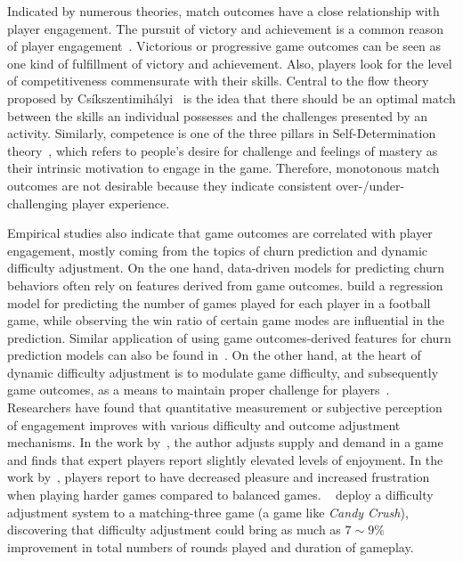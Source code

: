 Indicated by numerous theories, match outcomes have a close relationship with player engagement. The pursuit of victory and achievement is a common reason of player engagement~\cite{schoenau2011player,yee2006motivations,sherry2006video,wu2010falling,lazzaro2004we}. Victorious or progressive game outcomes can be seen as one kind of fulfillment of victory and achievement. Also, players look for the level of competitiveness commensurate with their skills. Central to the flow theory proposed by Cs\'{i}kszentimih\'{a}lyi~\cite{sweetser2005gameflow,flow1990psychology,chen2007flow} is the idea that there should be an optimal match between the skills an individual possesses and the challenges presented by an activity. Similarly, competence is one of the three pillars in Self-Determination theory~\cite{przybylski2010motivational,ryan2006motivational}, which refers to people's desire for challenge and feelings of mastery as their intrinsic motivation to engage in the game. Therefore, monotonous match outcomes are not desirable because they indicate consistent over-/under-challenging player experience. 

Empirical studies also indicate that game outcomes are correlated with player engagement, mostly coming from the topics of churn prediction and dynamic difficulty adjustment. On the one hand, data-driven models for predicting churn behaviors often rely on features derived from game outcomes. \cite{weber2011using} build a regression model for predicting the number of games played for each player in a football game, while observing the win ratio of certain game modes are influential in the prediction. Similar application of using game outcomes-derived features for churn prediction models can also be found in~\cite{harrison2012players,xie2015predicting,}. On the other hand, at the heart of dynamic difficulty adjustment is to modulate game difficulty, and subsequently game outcomes, as a means to maintain proper challenge for players~\cite{hunicke2005case}. Researchers have found that quantitative measurement or subjective perception of engagement improves with various difficulty and outcome adjustment mechanisms. In the work by~\cite{hunicke2005case}, the author adjusts supply and demand in a game and finds that expert players report slightly elevated levels of enjoyment. In the work by~\cite{van2009incongruity}, players report to have decreased pleasure and increased frustration when playing harder games compared to balanced games. ~\cite{xue2017dynamic} deploy a difficulty adjustment system to a matching-three game (a game like \textit{Candy Crush}), discovering that difficulty adjustment could bring as much as $7 \sim 9 \%$ improvement in total numbers of rounds played and duration of gameplay.

